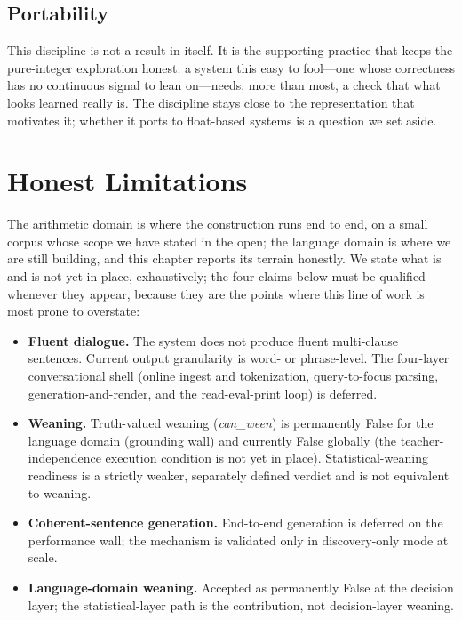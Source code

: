 \documentclass[11pt,a4paper]{article}
\begin{document}
\subsection{Portability}
This discipline is not a result in itself. It is the supporting practice
that keeps the pure-integer exploration honest: a system this easy to
fool---one whose correctness has no continuous signal to lean on---needs,
more than most, a check that what looks learned really is. The discipline
stays close to the representation that motivates it; whether it ports to
float-based systems is a question we set aside.

\section{Honest Limitations}
\label{sec:limitations}

The arithmetic domain is where the construction runs end to end, on a
small corpus whose scope we have stated in the open; the language domain
is where we are still building, and this chapter reports its terrain
honestly. We state what is and is not yet in place, exhaustively;
the four claims below must be qualified whenever they appear, because they
are the points where this line of work is most prone to overstate:

\begin{itemize}[leftmargin=*]
\item \textbf{Fluent dialogue.} The system does not produce fluent
multi-clause sentences. Current output granularity is word- or
phrase-level. The four-layer conversational shell (online ingest and
tokenization, query-to-focus parsing, generation-and-render, and the
read-eval-print loop) is deferred.
\item \textbf{Weaning.} Truth-valued weaning (\textit{can\_ween}) is
permanently False for the language domain (grounding wall) and currently
False globally (the teacher-independence execution condition is not yet
in place). Statistical-weaning readiness is a strictly weaker, separately
defined verdict and is not equivalent to weaning.
\item \textbf{Coherent-sentence generation.} End-to-end generation is
deferred on the performance wall; the mechanism is validated only in
discovery-only mode at scale.
\item \textbf{Language-domain weaning.} Accepted as permanently False at
the decision layer; the statistical-layer path is the contribution, not
decision-layer weaning.
\end{itemize}
\end{document}

